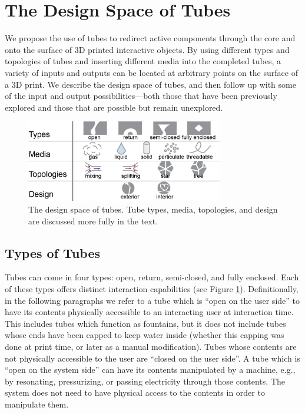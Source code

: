 \section{The Design Space of Tubes}

We propose the use of tubes to redirect active components through the core and onto the surface of 3D printed interactive objects.  By using different types and topologies of tubes and inserting different media into the completed tubes, a variety of inputs and outputs can be located at arbitrary points on the surface of a 3D print.  We describe the design space of tubes, and then follow up with some of the input and output possibilities---both those that have been previously explored and those that are possible but remain unexplored.

\begin{figure}[h]
\centering
    \includegraphics[width=3.4in]{figures/tubespace.png}
\caption{The design space of tubes.  Tube types, media, topologies, and design are discussed more fully in the text.  
}
\label{fig:tubespace}
\end{figure}

\subsection{Types of Tubes}

Tubes can come in four types: open, return, semi-closed, and fully enclosed.  Each of these types offers distinct interaction capabilities (see Figure \ref{fig:tubespace}).  Definitionally, in the following paragraphs we refer to a tube which is ``open on the user side'' to have its contents physically accessible to an interacting user at interaction time.  This includes tubes which function as fountains, but it does not include tubes whose ends have been capped to keep water inside (whether this capping was done at print time, or later as a manual modification).  Tubes whose contents are not physically accessible to the user are ``closed on the user side''.  A tube which is ``open on the system side'' can have its contents manipulated by a machine, e.g., by resonating, pressurizing, or passing electricity through those contents.  The system does not need to have physical access to the contents in order to manipulate them.

